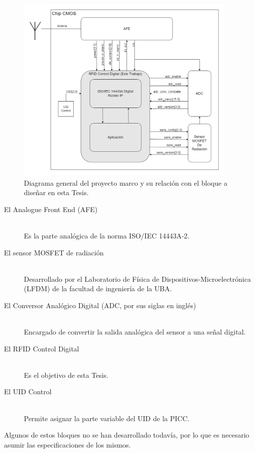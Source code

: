 \documentclass[a4paper, twoside, 11pt]{report}
\begin{document}
\begin{figure}[htb]
  \centering
  \includegraphics[width=0.95\textwidth]{./img/entire_project_v2}
  \caption{Diagrama general del proyecto marco y su relación con el bloque a diseñar en esta Tesis.}
  \label{fig:entire_project}
\end{figure}

\begin{description}
  \item[El Analogue Front End (AFE)] \hfill \\ Es la parte analógica de la norma ISO/IEC 14443A-2.
  \item[El sensor MOSFET de radiación] \hfill \\ Desarrollado por el Laboratorio de Física de Dispositivos-Microelectrónica (LFDM) de la facultad de ingeniería de la UBA.
  \item[El Conversor Analógico Digital (ADC, por sus siglas en inglés)] \hfill \\ Encargado de convertir la salida analógica del sensor a una señal digital.
  \item[El RFID Control Digital] \hfill \\ Es el objetivo de esta Tesis.
  \item[El UID Control] \hfill \\ Permite asignar la parte variable del UID de la PICC.
\end{description}

Algunos de estos bloques no se han desarrollado todavía, por lo que es necesario asumir las especificaciones de los mismos.
\end{document}
